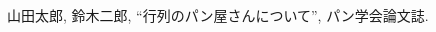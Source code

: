 \begin{thebibliography}{99}
    \thispagestyle{fancy}
    
     山田太郎, 鈴木二郎, ``行列のパン屋さんについて'', パン学会論文誌.

\end{thebibliography}    